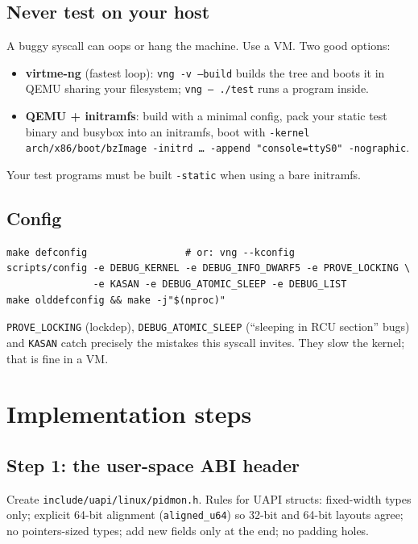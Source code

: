 \documentclass[11pt,a4paper]{article}
\newcommand{\kfile}[1]{\texttt{\small #1}}
\begin{document}
\subsection{Never test on your host}
A buggy syscall can oops or hang the machine. Use a VM. Two good options:
\begin{itemize}
  \item \textbf{virtme-ng} (fastest loop): \texttt{vng -v --build} builds the tree and boots it in QEMU sharing your filesystem; \texttt{vng -- ./test} runs a program inside.
  \item \textbf{QEMU + initramfs}: build with a minimal config, pack your static test binary and busybox into an initramfs, boot with \texttt{-kernel arch/x86/boot/bzImage -initrd \dots{} -append "console=ttyS0" -nographic}.
\end{itemize}
Your test programs must be built \texttt{-static} when using a bare initramfs.

\subsection{Config}
\begin{lstlisting}[style=sh]
make defconfig                 # or: vng --kconfig
scripts/config -e DEBUG_KERNEL -e DEBUG_INFO_DWARF5 -e PROVE_LOCKING \
               -e KASAN -e DEBUG_ATOMIC_SLEEP -e DEBUG_LIST
make olddefconfig && make -j"$(nproc)"
\end{lstlisting}
\texttt{PROVE\_LOCKING} (lockdep), \texttt{DEBUG\_ATOMIC\_SLEEP} (``sleeping in RCU section'' bugs) and \texttt{KASAN} catch precisely the mistakes this syscall invites. They slow the kernel; that is fine in a VM.

\section{Implementation steps}
\subsection{Step 1: the user-space ABI header}
Create \kfile{include/uapi/linux/pidmon.h}. Rules for UAPI structs: fixed-width types only; explicit 64-bit alignment (\texttt{aligned\_u64}) so 32-bit and 64-bit layouts agree; no pointers-sized types; add new fields only at the end; no padding holes.
\end{document}
